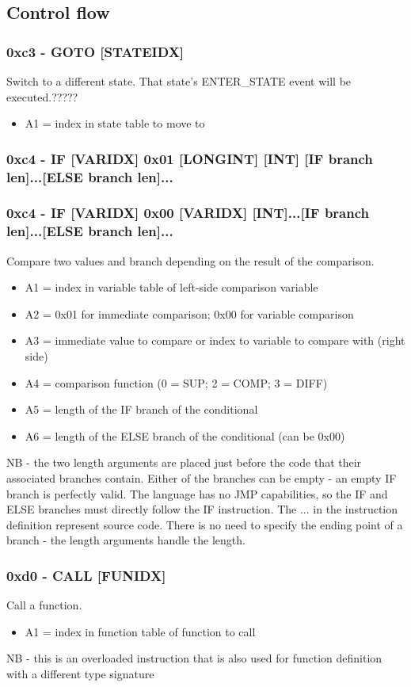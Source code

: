 \documentclass[12pt,a4paper]{scrbook}
\begin{document}
\subsection{Control flow}

\subsubsection{0xc3 - GOTO [STATEIDX]}
Switch to a different state.  That state's ENTER\_STATE event will be executed.?????
\begin{itemize}
\item A1 = index in state table to move to
\end{itemize}

\subsubsection{0xc4 - IF [VARIDX] 0x01 [LONGINT] [INT] [IF branch len]...[ELSE branch len]...}
\subsubsection{0xc4 - IF [VARIDX] 0x00 [VARIDX] [INT]...[IF branch len]...[ELSE branch len]...}
Compare two values and branch depending on the result of the comparison.
\begin{itemize}
\item A1 = index in variable table of left-side comparison variable
\item A2 = 0x01 for immediate comparison; 0x00 for variable comparison
\item A3 = immediate value to compare or index to variable to compare with (right side)
\item A4 = comparison function (0 = SUP; 2 = COMP; 3 = DIFF)
\item A5 = length of the IF branch of the conditional
\item A6 = length of the ELSE branch of the conditional (can be 0x00)
\end{itemize}
NB - the two length arguments are placed just before the code that their associated branches contain.
Either of the branches can be empty - an empty IF branch is perfectly valid.
The language has no JMP capabilities, so the IF and ELSE branches must directly follow the IF instruction.
The ... in the instruction definition represent source code.  There is no need to specify the
ending point of a branch - the length arguments handle the length.

\subsubsection{0xd0 - CALL [FUNIDX]}
Call a function.
\begin{itemize}
\item A1 = index in function table of function to call
\end{itemize}
NB - this is an overloaded instruction that is also used for function definition with a different
type signature
\end{document}
